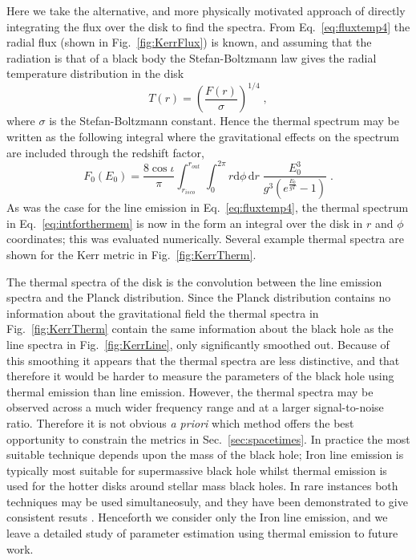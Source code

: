Here we take the alternative, and more physically motivated approach of directly integrating the flux over the disk to find the spectra. From Eq.\ \ref{eq:fluxtemp4} the radial flux (shown in Fig.\ \ref{fig:KerrFlux}) is known, and assuming that the radiation is that of a black body the Stefan-Boltzmann law gives the radial temperature distribution in the disk
\begin{equation} T(r)=\left( \frac{F(r)}{\sigma} \right)^{1/4} \; ,\end{equation}
where $\sigma$ is the Stefan-Boltzmann constant. Hence the thermal spectrum may be written as the following integral where the gravitational effects on the spectrum are included through the redshift factor,
\begin{equation}\label{eq:intforthermem}F_{0}(E_{0})=\frac{8\cos \iota}{\pi}\int_{r_{isco}}^{r_{out}}\int_{0}^{2\pi}r\textrm{d}\phi\,\textrm{d}r\;\frac{E_{0}^{3}}{g^{3}\left(e^{\frac{E_{0}}{gT}}-1\right)}\; .\end{equation}
As was the case for the line emission in Eq.\ \ref{eq:fluxtemp4}, the thermal spectrum in Eq.\ \ref{eq:intforthermem} is now in the form an integral over the disk in $r$ and $\phi$ coordinates; this was evaluated numerically. Several example thermal spectra are shown for the Kerr metric in Fig.\ \ref{fig:KerrTherm}.

The thermal spectra of the disk is the convolution between the line emission spectra and the Planck distribution. Since the Planck distribution contains no information about the gravitational field the thermal spectra in Fig.\ \ref{fig:KerrTherm} contain the same information about the black hole as the line spectra in Fig.\ \ref{fig:KerrLine}, only significantly smoothed out. Because of this smoothing it appears that the thermal spectra are less distinctive, and that therefore it would be harder to measure the parameters of the black hole using thermal emission than line emission. However, the thermal spectra may be observed across a much wider frequency range and at a larger signal-to-noise ratio. Therefore it is not obvious \emph{a priori} which method offers the best opportunity to constrain the metrics in Sec.\ \ref{sec:spacetimes}. In practice the most suitable technique depends upon the mass of the black hole; Iron line emission is typically most suitable for supermassive black hole whilst thermal emission is used for the hotter disks around stellar mass black holes. In rare instances both techniques may be used simultaneosuly, and they have been demonstrated to give consistent resuts \cite{2011MNRAS.416..941S}. Henceforth we consider only the Iron line emission, and we leave a detailed study of parameter estimation using thermal emission to future work. 

